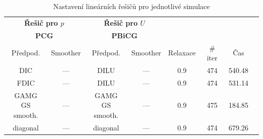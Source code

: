 \documentclass[a4paper,12pt]{report}
\theoremstyle{remark}
\begin{document}
\begin{table}[H]
	\centering
	\caption{Nastavení lineárních řešičů pro jednotlivé simulace}
	\renewcommand{\arraystretch}{1.9}
	\begin{tabular}{*8c}
		\toprule	
		
		\multicolumn{2}{c}{\textbf{Řešič pro $p$}} & \multicolumn{2}{c}{\textbf{Řešič pro $U$}}\\
		\multicolumn{2}{c}{\textbf{PCG}} & \multicolumn{2}{c}{\textbf{PBiCG}}\\		
		\midrule
		Předpod.&Smoother&Předpod.&Smoother&Relaxace& \# iter&Čas\\
		\midrule
		
		
		DIC & --- &  DILU & --- &0.9&474&540.48\\								
		
		FDIC & --- &  DILU & --- &0.9&474&531.14\\	
		
		\shortstack{GAMG\\GS smooth.}& --- &  \shortstack{GAMG\\GS smooth.}& --- &0.9&475&184.85\\	
		
		diagonal & --- & diagonal & --- &0.9&474&679.26\\	
		
		\bottomrule
	\end{tabular}
	
	\label{table:solvers_set2}
	
\end{table}
\end{document}
